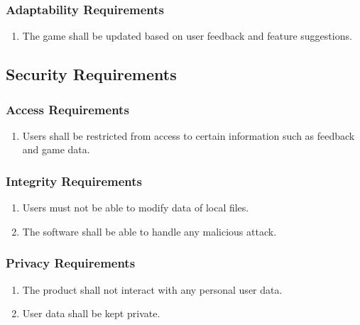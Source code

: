\documentclass[]{article}
\begin{document}
\subsubsection{Adaptability Requirements}
\label{ssub:adaptability_requirements}
\begin{enumerate}[{MS}1. ]
	\item The game shall be updated based on user feedback and feature suggestions.
\end{enumerate}


\subsection{Security Requirements}
\label{sub:security_requirements}

\subsubsection{Access Requirements}
\label{ssub:access_requirements}
\begin{enumerate}[{SR}1. ]
	\item Users shall be restricted from access to certain information such as feedback and game data.
\end{enumerate}

\subsubsection{Integrity Requirements}
\label{ssub:integrity_requirements}
\begin{enumerate}[{SR}1. ]
	\item Users must not be able to modify data of local files.
	\item The software shall be able to handle any malicious attack.
\end{enumerate}

\subsubsection{Privacy Requirements}
\label{ssub:privacy_requirements}
\begin{enumerate}[{SR}1. ]
	\item The product shall not interact with any personal user data.
	\item User data shall be kept private.
\end{enumerate}
\end{document}
